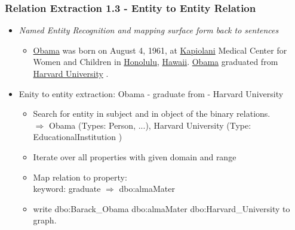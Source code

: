 \documentclass{beamer}
\begin{document}
\begin{frame}
\frametitle{Relation Extraction 1.3 - Entity to Entity Relation}
\begin{example}
	\begin{itemize}
		\item \textit{Named Entity Recognition and mapping surface form back to sentences} \\
		\begin{itemize} \item \underline{Obama} was born on August 4, 1961, at \underline{Kapiolani} Medical Center for Women and Children in \underline{Honolulu}, \underline{Hawaii}. \underline{Obama} graduated from \underline{Harvard University} .
		\end{itemize}
		\item Enity to entity extraction: Obama - graduate from - Harvard University \begin{itemize} \item Search for entity in subject and in object of the binary relations. \\ $\Rightarrow$ Obama (Types: Person, ...), Harvard University (Type: EducationalInstitution )
			\item Iterate over all properties with given domain and range
			\item Map relation to property: \\ keyword: graduate $\Rightarrow$ dbo:almaMater
			\item write dbo:Barack\_Obama dbo:almaMater dbo:Harvard\_University to graph.
		\end{itemize}		 

	\end{itemize}
\end{example}
\end{frame}
\end{document}
